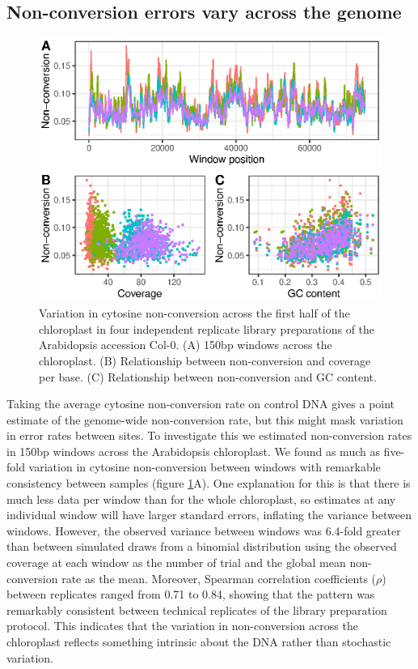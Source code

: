 \documentclass[twocolumn,twoside,lettersize]{article}
\begin{document}
\subsection{Non-conversion errors vary across the genome}

\begin{figure}
  \begin{center}
    \includegraphics{figure2.eps}
    \caption{
        Variation in cytosine non-conversion across the first half of the chloroplast in four independent replicate library preparations of the Arabidopsis accession Col-0.
        (A) 150bp windows across the chloroplast.
        (B) Relationship between non-conversion and coverage per base.
        (C) Relationship between non-conversion and GC content.
    }
    \label{fig:uncertainty}
  \end{center}
\end{figure}

Taking the average cytosine non-conversion rate on control DNA gives a point estimate of the genome-wide non-conversion rate, but this might mask variation in error rates between sites.
To investigate this we estimated non-conversion rates in 150bp windows across the Arabidopsis chloroplast.
We found as much as five-fold variation in cytosine non-conversion between windows with remarkable consistency between samples (figure \ref{fig:uncertainty}A).
One explanation for this is that there is much less data per window than for the whole chloroplast, so estimates at any individual window will have larger standard errors, inflating the variance between windows.
However, the observed variance between windows was 6.4-fold greater than between simulated draws from a binomial distribution using the observed coverage at each window as the number of trial and the global mean non-conversion rate as the mean.
Moreover, Spearman correlation coefficients ($\rho$) between replicates ranged from 0.71 to 0.84, showing that the pattern was remarkably consistent between technical replicates of the library preparation protocol.
This indicates that the variation in non-conversion across the chloroplast reflects something intrinsic about the DNA rather than stochastic variation.
\end{document}

